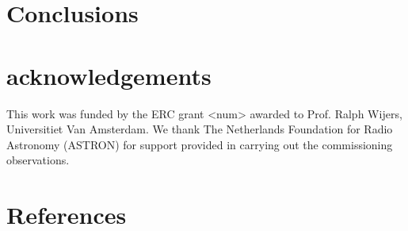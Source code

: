 \documentclass{ws-jai}
\begin{document}

\section {\label{sec:conclusion} Conclusions}

\section* {acknowledgements}

This work  was funded  by the ERC  grant <num> awarded  to Prof.   Ralph Wijers,
Universitiet  Van Amsterdam.   We  thank The  Netherlands  Foundation for  Radio
Astronomy  (ASTRON)  for support  provided  in  carrying out  the  commissioning
observations.

\section*{References}



\end{document}
